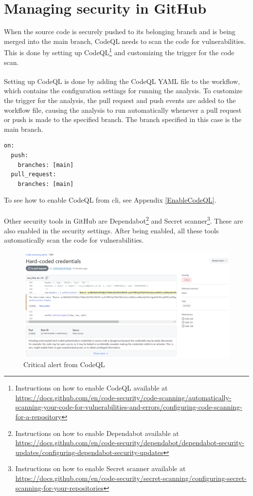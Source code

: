 \section{Managing security in GitHub}
When the source code is securely pushed to its belonging branch and is being merged into the main branch, CodeQL needs to scan the code for vulnerabilities. This is done by setting up CodeQL\footnote{Instructions on how to enable CodeQL available at \url{https://docs.github.com/en/code-security/code-scanning/automatically-scanning-your-code-for-vulnerabilities-and-errors/configuring-code-scanning-for-a-repository}} and customizing the trigger for the code scan. 
\\~\\
Setting up CodeQL is done by adding the CodeQL YAML file to the workflow, which contains the configuration settings for running the analysis. To customize the trigger for the analysis, the pull request and push events are added to the workflow file, causing the analysis to run automatically whenever a pull request or push is made to the specified branch. The branch specified in this case is the main branch. \cite{CodeQLCustom} 
\\
\begin{lstlisting}[language=terraform, caption=Custom trigger for CodeQL alerts, captionpos=b, frame=single]
on:
  push:
    branches: [main]
  pull_request:
    branches: [main]
\end{lstlisting}

To see how to enable CodeQL from \acrshort{cli}, see Appendix \ref{EnableCodeQL}.
\\~\\
 Other security tools in GitHub are Dependabot\footnote{Instructions on how to enable Dependabot available at \url{https://docs.github.com/en/code-security/dependabot/dependabot-security-updates/configuring-dependabot-security-updates}} and Secret scanner\footnote{Instructions on how to enable Secret scanner available at \url{https://docs.github.com/en/code-security/secret-scanning/configuring-secret-scanning-for-your-repositories}}. These are also enabled in the security settings. After being enabled, all these tools automatically scan the code for vulnerabilities.

\vspace{2mm}
\begin{figure}[H]
    \centering
    \includegraphics[width=0.8\columnwidth]{Images/codescan.png}
    \caption{Critical alert from CodeQL}
    \label{fig: Critical alert CodeQL}
\end{figure}

